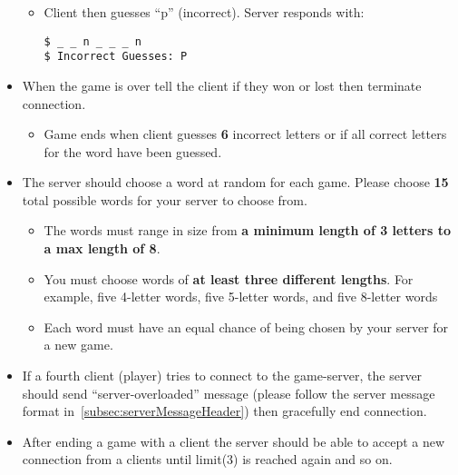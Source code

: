 \documentclass[12pt]{article}
\begin{document}
\begin{itemize}
\begin{itemize}
\item Client then guesses ``p'' (incorrect).
Server responds with:

\begin{verbatim}
$ _ _ n _ _ _ n
$ Incorrect Guesses: P
\end{verbatim}

\end{itemize}
\item When the game is over tell the client if they won or lost then terminate connection.
\begin{itemize}
\item Game ends when client guesses {\bf 6} incorrect letters or if all correct letters for the
word have been guessed.
\end{itemize}
\item The server should choose a word at random for each game.
Please choose {\bf 15} total
possible words for your server to choose from.
\begin{itemize}
\item The words must range in size from {\bf a minimum length of 3 letters to a max length
of 8}.
\item You must choose words of {\bf at least three different lengths}.
For example, five 4-letter words, five 5-letter words, and five 8-letter words
\item Each word must have an equal chance of being chosen by your server for a new
game.
\end{itemize}
\item If a fourth client (player) tries to connect to the game-server, the server should send
``server-overloaded'' message (please follow the server message format in~\autoref{subsec:serverMessageHeader}) then gracefully end connection.
\item After ending a game with a client the server should be able to accept a new connection
from a clients until limit(3) is reached again and so on.
\end{itemize}
\end{document}
